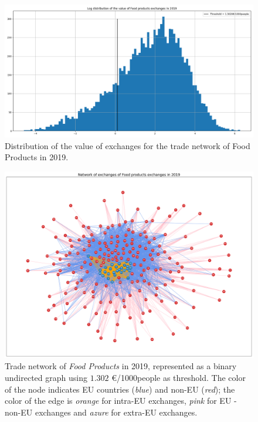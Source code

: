 \begin{figure}[h]
    \centering
    \includegraphics[width=\textwidth]{pics/thresh_complete_y19_p10.png}
    \caption{Distribution of the value of exchanges for the trade network of Food Products in 2019.}
    \label{fig:distrfood19}
\end{figure}

\begin{figure}
    \centering
    \includegraphics[width=\textwidth]{pics/complete_y19_p10_bin_7.png}
    \caption[Trade network of \textit{Food Products} in 2019, represented as a binary graph.]{Trade network of \textit{Food Products} in 2019, represented as a binary undirected graph using $1.302$ €/1000people as threshold. The color of the node indicates EU countries (\textit{blue}) and non-EU (\textit{red}); the color of the edge is \textit{orange} for intra-EU exchanges, \textit{pink} for EU - non-EU exchanges and \textit{azure} for extra-EU exchanges.}
    \label{fig:foodbingraph}
\end{figure}